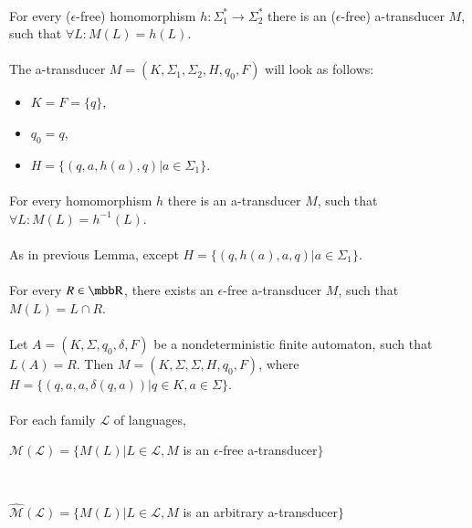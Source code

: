 \paragraph{}
\clema For every ($\epsilon $-free) homomorphism $h: \Sigma_{1}^{*} \rightarrow \Sigma_{2}^{*}$ there is an ($\epsilon $-free) a-transducer $M$, such that $\forall L: M(L) = h(L)$.

\paragraph{}
\dokaz The a-transducer $M=(K, \Sigma_{1}, \Sigma_{2}, H, q_{0}, F)$ will look as follows:
\begin{itemize}
\item $K = F = \{ q \}$,
\item $q_{0} = q$,
\item $H = \{ (q, a, h(a), q) | a \in \Sigma_{1} \}$. \square
\end{itemize}

\paragraph{}
\clema For every homomorphism $h$ there is an a-transducer $M$, such that $\forall L: M(L) = h^{-1}(L)$.

\paragraph{}
\dokaz As in previous Lemma, except $H = \{ (q, h(a), a, q) | a \in \Sigma_{1} \}$. \square

\paragraph{}
\clema For every $R \in \R $, there exists an $\epsilon $-free a-transducer $M$, such that $M(L) = L \cap R$.

\paragraph{}
\dokaz Let $A = (K, \Sigma, q_{0}, \delta, F)$ be a nondeterministic finite automaton, such that $L(A) = R$. Then $M=(K, \Sigma, \Sigma, H, q_{0}, F)$, where $H=\{ (q, a, a, \delta (q,a)) | q \in K, a \in \Sigma \} $. \square

\paragraph{}
\oznacenie For each family $\mathcal{L} $ of languages, \\
\centerline{$\mathcal{M(L)} = \{ M(L) | L \in \mathcal{L}, M$ is an $\epsilon $-free a-transducer$\} $} \\
\centerline{$\mathcal{\hat{M}(L)} = \{ M(L) | L \in \mathcal{L}, M$ is an arbitrary a-transducer$\} $}

